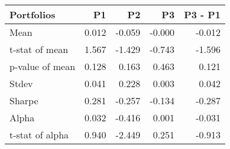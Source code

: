 \begin{tabular}{lrrrr}
\toprule
Portfolios & P1 & P2 & P3 & P3 - P1 \\
\midrule
Mean & 0.012 & -0.059 & -0.000 & -0.012 \\
t-stat of mean & 1.567 & -1.429 & -0.743 & -1.596 \\
p-value of mean & 0.128 & 0.163 & 0.463 & 0.121 \\
Stdev & 0.041 & 0.228 & 0.003 & 0.042 \\
Sharpe & 0.281 & -0.257 & -0.134 & -0.287 \\
Alpha & 0.032 & -0.416 & 0.001 & -0.031 \\
t-stat of alpha & 0.940 & -2.449 & 0.251 & -0.913 \\
\bottomrule
\end{tabular}
